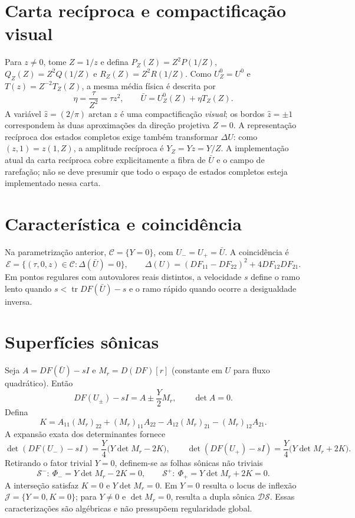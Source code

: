 \documentclass[11pt,a4paper]{article}
\begin{document}
\section{Carta recíproca e compactificação visual}
Para $z\ne0$, tome $Z=1/z$ e defina $P_Z(Z)=Z^2P(1/Z)$, $Q_Z(Z)=Z^2Q(1/Z)$ e $R_Z(Z)=Z^2R(1/Z)$. Como $U^0_Z=U^0$ e $T(z)=Z^{-2}T_Z(Z)$, a mesma média física é descrita por
\[
\boxed{\eta=\frac{\tau}{Z^2}=\tau z^2},\qquad
\bar U=U^0_Z(Z)+\eta T_Z(Z).
\]
A variável $\hat z=(2/\pi)\arctan z$ é uma compactificação \emph{visual}; os bordos $\hat z=\pm1$ correspondem às duas aproximações da direção projetiva $Z=0$. A representação recíproca dos estados completos exige também transformar $\Delta U$: como $(z,1)=z(1,Z)$, a amplitude recíproca é $Y_Z=Yz=Y/Z$. A implementação atual da carta recíproca cobre explicitamente a fibra de $\bar U$ e o campo de rarefação; não se deve presumir que todo o espaço de estados completos esteja implementado nessa carta.
\section{Característica e coincidência}
Na parametrização anterior, $\mathcal C=\{Y=0\}$, com $U_-=U_+=\bar U$. A coincidência é
\[
\mathcal E=\{(\tau,0,z)\in\mathcal C:\Delta(\bar U)=0\},\qquad
\Delta(U)=(DF_{11}-DF_{22})^2+4DF_{12}DF_{21}.
\]
Em pontos regulares com autovalores reais distintos, a velocidade $s$ define o ramo lento quando $s<\operatorname{tr}DF(\bar U)-s$ e o ramo rápido quando ocorre a desigualdade inversa.
\section{Superfícies sônicas}
Seja $A=DF(\bar U)-sI$ e $M_r=D(DF)[r]$ (constante em $U$ para fluxo quadrático). Então
\[
DF(U_\pm)-sI=A\pm\frac Y2M_r,\qquad\det A=0.
\]
Defina
\[
K=A_{11}(M_r)_{22}+(M_r)_{11}A_{22}-A_{12}(M_r)_{21}-(M_r)_{12}A_{21}.
\]
A expansão exata dos determinantes fornece
\[
\det(DF(U_-)-sI)=\frac Y4\big(Y\det M_r-2K\big),\qquad
\det(DF(U_+)-sI)=\frac Y4\big(Y\det M_r+2K\big).
\]
Retirando o fator trivial $Y=0$, definem-se as folhas sônicas não triviais
\[
\boxed{\mathcal S^-:\ \Phi_-=Y\det M_r-2K=0},\qquad
\boxed{\mathcal S^+:\ \Phi_+=Y\det M_r+2K=0}.
\]
A interseção satisfaz $K=0$ e $Y\det M_r=0$. Em $Y=0$ resulta o locus de inflexão $\mathcal J=\{Y=0,K=0\}$; para $Y\ne0$ e $\det M_r=0$, resulta a dupla sônica $\mathcal{DS}$. Essas caracterizações são algébricas e não pressupõem regularidade global.
\end{document}
